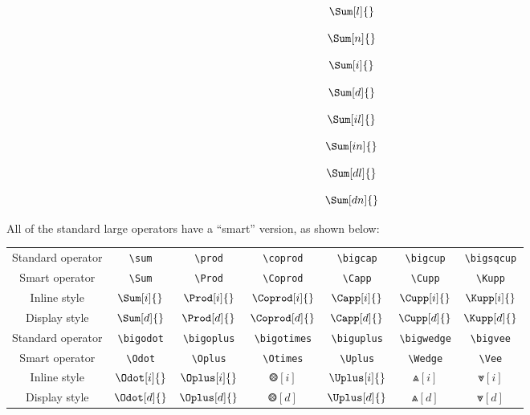 \begin{multicols}{2}
\begin{verbbox}
$$\Sum[l]{}$$
\end{verbbox}

\begin{verbbox}
$$\Sum[n]{}$$
\end{verbbox}

\begin{verbbox}
$$\Sum[i]{}$$
\end{verbbox}

\begin{verbbox}
$$\Sum[d]{}$$
\end{verbbox}
\begin{verbbox}
$$\Sum[il]{}$$
\end{verbbox}

\begin{verbbox}
$$\Sum[in]{}$$
\end{verbbox}

\begin{verbbox}
$$\Sum[dl]{}$$
\end{verbbox}

\begin{verbbox}
$$\Sum[dn]{}$$
\end{verbbox}
\end{multicols}

All of the standard large operators have a ``smart'' version, as shown below:

\begin{center}
\renewcommand*{\arraystretch}{1.5} %
\begin{tabular}{ccccccc}
    Standard operator & \verb!\sum! & \verb!\prod! & \verb!\coprod! & \verb!\bigcap! & \verb!\bigcup! & \verb!\bigsqcup! \\
    Smart operator & \verb!\Sum! & \verb!\Prod! & \verb!\Coprod! & \verb!\Capp! & \verb!\Cupp! & \verb!\Kupp! \\
    Inline style & $\Sum[i]{}$ & $\Prod[i]{}$ & $\Coprod[i]{}$ & $\Capp[i]{}$ & $\Cupp[i]{}$ & $\Kupp[i]{}$ \\
    Display style & $\Sum[d]{}$ & $\Prod[d]{}$ & $\Coprod[d]{}$ & $\Capp[d]{}$ & $\Cupp[d]{}$ & $\Kupp[d]{}$ \\[12pt] %
    Standard operator & \verb!\bigodot! & \verb!\bigoplus! & \verb!\bigotimes! & \verb!\biguplus! & \verb!\bigwedge! & \verb!\bigvee! \\
    Smart operator & \verb!\Odot! & \verb!\Oplus! & \verb!\Otimes! & \verb!\Uplus! & \verb!\Wedge! & \verb!\Vee! \\
    Inline style & $\Odot[i]{}$ & $\Oplus[i]{}$ & $\Otimes[i]{}$ & $\Uplus[i]{}$ & $\Wedge[i]{}$ & $\Vee[i]{}$ \\
    Display style & $\Odot[d]{}$ & $\Oplus[d]{}$ & $\Otimes[d]{}$ & $\Uplus[d]{}$ & $\Wedge[d]{}$ & $\Vee[d]{}$
\end{tabular}
\end{center}

